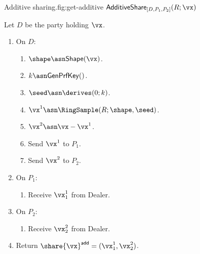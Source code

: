 \begin{Boxfig}{Additive sharing.}{fig:get-additive}
  {$\mathsf{AdditiveShare}_{[D, P_1, P_2]}(R; \vx)$}

  Let $D$ be the party holding $\vx$.

  \begin{enumerate}
    \item On $D$:
  \begin{enumerate}
    \item $\shape \asn \mathsf{Shape}(\vx)$.
    \item $k \asn \mathsf{GenPrfKey}()$.
    \item $\seed \asn \derives(0; k)$.
    \item $\vx^1 \asn \RingSample(R; \shape, \seed)$.
    \item $\vx^2 \asn \vx - \vx^1$.
    \item Send $\vx^1$ to $P_1$.
    \item Send $\vx^2$ to $P_2$.
  \end{enumerate}
  \item On $P_1$:
  \begin{enumerate}
      \item Receive $\vx^1_1$ from Dealer.
  \end{enumerate}
  \item On $P_2$:
  \begin{enumerate}
      \item Receive $\vx^2_2$ from Dealer.
  \end{enumerate}
  \item Return $\share{\vx}^{\mathsf{add}} = (\vx^1_1, \vx^2_2)$.
\end{enumerate}
\end{Boxfig}

